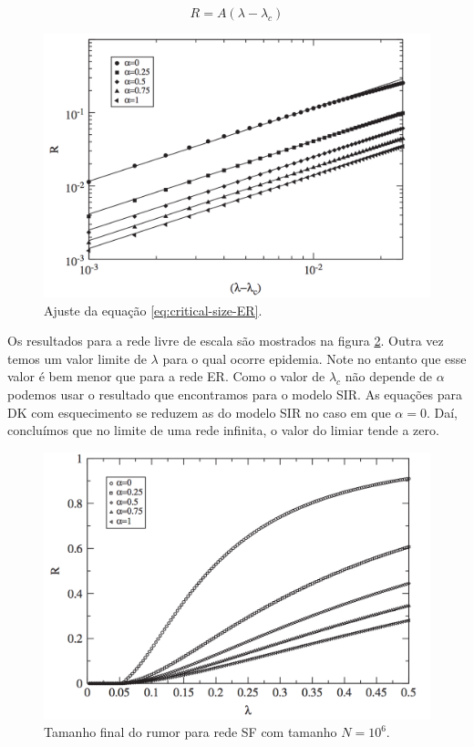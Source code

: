 \documentclass[a4paper,11pt]{report}
\begin{document}
\begin{equation}
R=A(\lambda-\lambda_c)
\label{eq:critical-size-ER}
\end{equation}

\begin{figure}[ht!]
\begin{center}
\includegraphics[scale=0.3]{./images/critical-ER}
\end{center}
\caption{Ajuste da equa\c{c}\~ao \ref{eq:critical-size-ER}.}
\label{fig:critical-ER}
\end{figure}


Os resultados para a rede livre de escala s\~ao mostrados na figura \ref{fig:rumor-size-SF}. Outra vez temos um valor limite de $\lambda$ para o qual ocorre epidemia. Note no entanto que esse valor \'e bem menor que para a rede ER. Como o valor de $\lambda_c$ n\~ao depende de $\alpha$ podemos usar o resultado que encontramos para o modelo SIR. As equa\c{c}\~oes para DK com esquecimento se reduzem as do modelo SIR no caso em que $\alpha=0$. Da\'i, conclu\'imos que no limite de uma rede infinita, o valor do limiar tende a zero. 
\begin{figure}[ht!]
\begin{center}
\includegraphics[scale=0.3]{./images/rumor-size-SF}
\end{center}
\caption{Tamanho final do rumor para rede SF com tamanho $N=10^6$.}
\label{fig:rumor-size-SF}
\end{figure}
\end{document}
